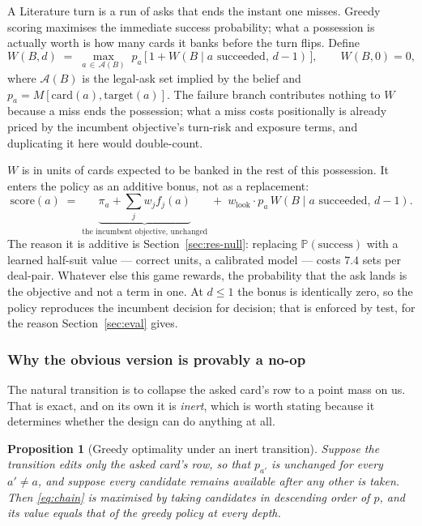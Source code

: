 \documentclass[11pt,letterpaper]{article}
\newtheorem{proposition}{Proposition}
\newcommand{\Prob}{\ensuremath{\mathbb{P}}}
\begin{document}
A Literature turn is a run of asks that ends the instant one misses. Greedy
scoring maximises the immediate success probability; what a possession is
actually worth is how many cards it banks before the turn flips. Define
\begin{equation}
W(B, d) \;=\; \max_{a \,\in\, \mathcal{A}(B)}\;
p_a \,\bigl[\, 1 + W(B \mid a \text{ succeeded},\, d-1) \,\bigr],
\qquad W(B, 0) = 0,
\label{eq:chain}
\end{equation}
where $\mathcal{A}(B)$ is the legal-ask set implied by the belief and
$p_a = M[\text{card}(a), \text{target}(a)]$. The failure branch contributes
nothing to $W$ because a miss ends the possession; what a miss costs
positionally is already priced by the incumbent objective's turn-risk and
exposure terms, and duplicating it here would double-count.

$W$ is in units of cards expected to be banked in the rest of this possession.
It enters the policy as an additive bonus, not as a replacement:
\begin{equation}
\text{score}(a) \;=\; \underbrace{\pi_a + \textstyle\sum_j w_j f_j(a)}
_{\text{the incumbent objective, unchanged}}
\;+\; w_{\mathrm{look}} \cdot p_a \, W(B \mid a \text{ succeeded},\, d-1).
\label{eq:lookscore}
\end{equation}
The reason it is additive is Section~\ref{sec:res-null}: replacing
$\Prob(\text{success})$ with a learned half-suit value --- correct units, a
calibrated model --- costs $7.4$ sets per deal-pair. Whatever else this game
rewards, the probability that the ask lands is the objective and not a term in
one. At $d \le 1$ the bonus is identically zero, so the policy reproduces the
incumbent decision for decision; that is enforced by test, for the reason
Section~\ref{sec:eval} gives.

\subsubsection{Why the obvious version is provably a no-op}

The natural transition is to collapse the asked card's row to a point mass on
us. That is exact, and on its own it is \emph{inert}, which is worth stating
because it determines whether the design can do anything at all.

\begin{proposition}[Greedy optimality under an inert transition]
\label{prop:greedy}
Suppose the transition edits only the asked card's row, so that $p_{a'}$ is
unchanged for every $a' \ne a$, and suppose every candidate remains available
after any other is taken. Then \eqref{eq:chain} is maximised by taking
candidates in descending order of $p$, and its value equals that of the greedy
policy at every depth.
\end{proposition}
\end{document}
